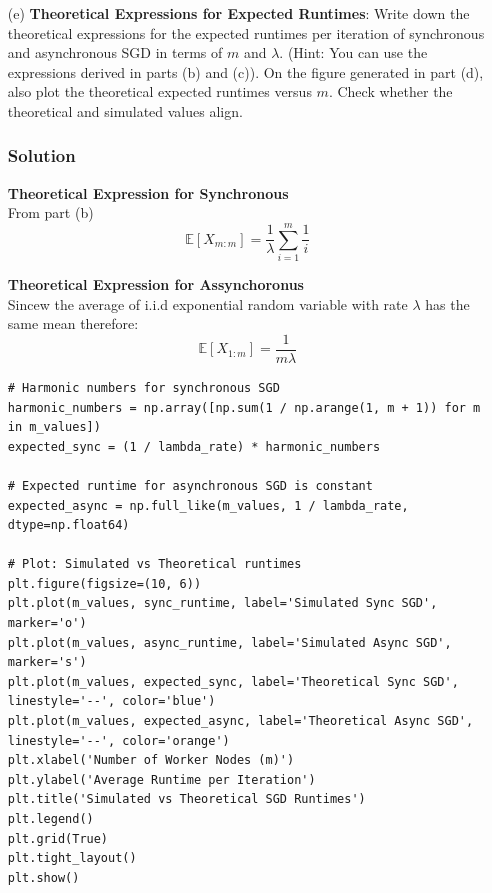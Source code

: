 \documentclass{article}
\begin{document}
\begin{enumerate}
    \item[(e)] \textbf{Theoretical Expressions for Expected Runtimes}:
    Write down the theoretical expressions for the expected runtimes per iteration of synchronous and asynchronous SGD in terms of $m$ and $\lambda$. (Hint: You can use the expressions derived in parts (b) and (c)). On the figure generated in part (d), also plot the theoretical expected runtimes versus $m$. Check whether the theoretical and simulated values align.

    \subsubsection*{Solution}
    \textbf{Theoretical Expression for Synchronous}\\
    From part (b)
    \[\mathbb{E}[X_{m:m}] = \frac{1}{\lambda} \sum_{i=1}^{m} \frac{1}{i}\]

    \textbf{Theoretical Expression for Assynchoronus}\\
    Sincew the average of i.i.d exponential random variable with rate \(\lambda\) has the same mean therefore:
    \[\mathbb{E}[X_{1:m}] = \frac{1}{m \lambda}\]

    \begin{verbatim}
# Harmonic numbers for synchronous SGD
harmonic_numbers = np.array([np.sum(1 / np.arange(1, m + 1)) for m in m_values])
expected_sync = (1 / lambda_rate) * harmonic_numbers

# Expected runtime for asynchronous SGD is constant
expected_async = np.full_like(m_values, 1 / lambda_rate, dtype=np.float64)

# Plot: Simulated vs Theoretical runtimes
plt.figure(figsize=(10, 6))
plt.plot(m_values, sync_runtime, label='Simulated Sync SGD', marker='o')
plt.plot(m_values, async_runtime, label='Simulated Async SGD', marker='s')
plt.plot(m_values, expected_sync, label='Theoretical Sync SGD', linestyle='--', color='blue')
plt.plot(m_values, expected_async, label='Theoretical Async SGD', linestyle='--', color='orange')
plt.xlabel('Number of Worker Nodes (m)')
plt.ylabel('Average Runtime per Iteration')
plt.title('Simulated vs Theoretical SGD Runtimes')
plt.legend()
plt.grid(True)
plt.tight_layout()
plt.show()
    \end{verbatim}


\end{enumerate}
\end{document}
